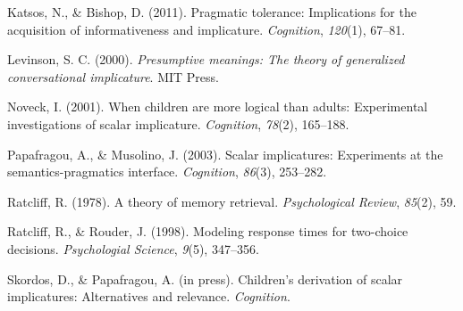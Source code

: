 \documentclass[10pt, letterpaper]{article}
\begin{document}
Katsos, N., \& Bishop, D. (2011). Pragmatic tolerance: Implications for
the acquisition of informativeness and implicature. \emph{Cognition},
\emph{120}(1), 67--81.

Levinson, S. C. (2000). \emph{Presumptive meanings: The theory of
generalized conversational implicature}. MIT Press.

Noveck, I. (2001). When children are more logical than adults:
Experimental investigations of scalar implicature. \emph{Cognition},
\emph{78}(2), 165--188.

Papafragou, A., \& Musolino, J. (2003). Scalar implicatures: Experiments
at the semantics-pragmatics interface. \emph{Cognition}, \emph{86}(3),
253--282.

Ratcliff, R. (1978). A theory of memory retrieval. \emph{Psychological
Review}, \emph{85}(2), 59.

Ratcliff, R., \& Rouder, J. (1998). Modeling response times for
two-choice decisions. \emph{Psychologial Science}, \emph{9}(5),
347--356.

Skordos, D., \& Papafragou, A. (in press). Children's derivation of
scalar implicatures: Alternatives and relevance. \emph{Cognition}.
\end{document}
